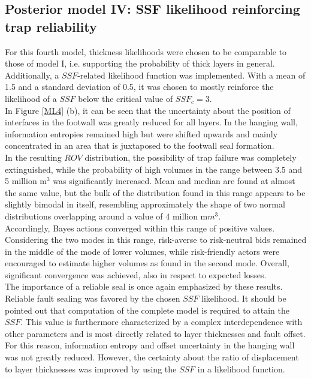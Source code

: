 		\subsection{Posterior model IV: SSF likelihood reinforcing trap reliability}%
		For this fourth model, thickness likelihoods were chosen to be comparable to those of model I, i.e. supporting the probability of thick layers in general. Additionally, a $SSF$-related likelihood function was implemented. With a mean of 1.5 and a standard deviation of 0.5, it was chosen to mostly reinforce the likelihood of a $SSF$ below the critical value of $SSF_c = 3$.\\
		In Figure \ref{ML4} (b), it can be seen that the uncertainty about the position of interfaces in the footwall was greatly reduced for all layers. In the hanging wall, information entropies remained high but were shifted upwards and mainly concentrated in an area that is juxtaposed to the footwall seal formation.\\
		In the resulting $ROV$ distribution, the possibility of trap failure was completely extinguished, while the probability of high volumes in the range between 3.5  and 5 million m$^3$ was significantly increased. Mean and median are found at almost the same value, but the bulk of the distribution found in this range appears to be slightly bimodal in itself, resembling approximately the shape of two normal distributions overlapping around a value of 4 million m$m^3$.\\
		Accordingly, Bayes actions converged within this range of positive values. Considering the two modes in this range, risk-averse to risk-neutral bids remained in the middle of the mode of lower volumes, while risk-friendly actors were encouraged to estimate higher volumes as found in the second mode. Overall, significant convergence was achieved, also in respect to expected losses.\\		
		The importance of a reliable seal is once again emphasized by these results. Reliable fault sealing was favored by the chosen $SSF$ likelihood. It should be pointed out that computation of the complete model is required to attain the $SSF$. This value is furthermore characterized by a complex interdependence with other parameters and is most directly related to layer thicknesses and fault offset. For this reason, information entropy and offset uncertainty in the hanging wall was not greatly reduced. However, the certainty about the ratio of displacement to layer thicknesses was improved by using the $SSF$ in a likelihood function.
		
